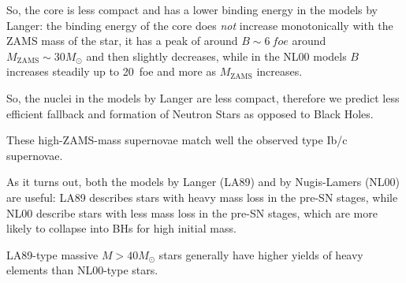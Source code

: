 \documentclass[main.tex]{subfiles}
\begin{document}
So, the core is less compact and has a lower binding energy in the models by Langer: the binding energy of the core does \emph{not} increase monotonically with the ZAMS mass of the star, it has a peak of around \(B \sim \SI{6}{foe}\) around \(M _{\text{ZAMS}} \sim 30M_{\odot}\) and then slightly decreases, while in the NL00 models \(B\) increases steadily up to \SI{20}{foe} and more as \(M _{\text{ZAMS}}\) increases.

So, the nuclei in the models by Langer are less compact, therefore we predict less efficient fallback and formation of Neutron Stars as opposed to Black Holes.

These high-ZAMS-mass supernovae match well the observed type Ib/c supernovae.

As it turns out, both the models by Langer (LA89) and by Nugis-Lamers (NL00) are useful: LA89 describes stars with heavy mass loss in the pre-SN stages, while NL00 describe stars with less mass loss in the pre-SN stages, which are more likely to collapse into BHs for high initial mass.

LA89-type massive \(M > 40 M_{\odot}\) stars generally have higher yields of heavy elements than NL00-type stars.








\end{document}
